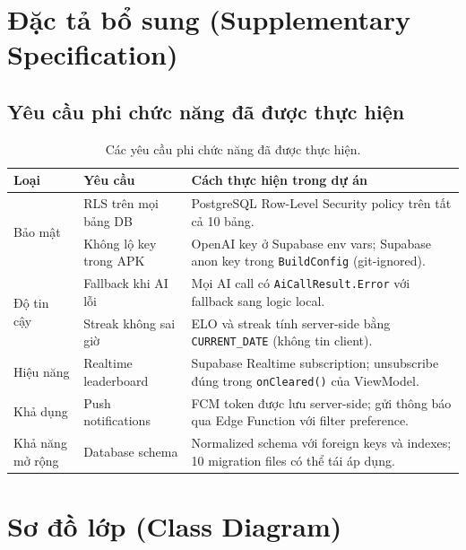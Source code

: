 \documentclass[12pt,a4paper]{article}
\begin{document}
\section{Đặc tả bổ sung (Supplementary Specification)}
\label{sec:supspec}

\subsection{Yêu cầu phi chức năng đã được thực hiện}

\begin{table}[H]
\centering
\begin{tabular}{@{}p{3cm}p{4cm}p{6.5cm}@{}}
\toprule
\textbf{Loại} & \textbf{Yêu cầu} & \textbf{Cách thực hiện trong dự án} \\
\midrule
\multirow{2}{*}{Bảo mật}
  & RLS trên mọi bảng DB & PostgreSQL Row-Level Security policy trên tất cả 10 bảng. \\
  & Không lộ key trong APK & OpenAI key ở Supabase env vars; Supabase anon key trong \texttt{BuildConfig} (git-ignored). \\
\midrule
\multirow{2}{*}{Độ tin cậy}
  & Fallback khi AI lỗi & Mọi AI call có \texttt{AiCallResult.Error} với fallback sang logic local. \\
  & Streak không sai giờ & ELO và streak tính server-side bằng \texttt{CURRENT\_DATE} (không tin client). \\
\midrule
Hiệu năng
  & Realtime leaderboard & Supabase Realtime subscription; unsubscribe đúng trong \texttt{onCleared()} của ViewModel. \\
\midrule
Khả dụng
  & Push notifications & FCM token được lưu server-side; gửi thông báo qua Edge Function với filter preference. \\
\midrule
Khả năng mở rộng
  & Database schema & Normalized schema với foreign keys và indexes; 10 migration files có thể tái áp dụng. \\
\bottomrule
\end{tabular}
\caption{Các yêu cầu phi chức năng đã được thực hiện.}
\end{table}

\section{Sơ đồ lớp (Class Diagram)}
\label{sec:classdiagram}
\end{document}
